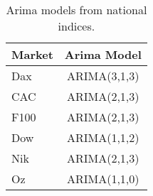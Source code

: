 \begin{table}[ht]
\centering
\caption[Arima models.]{Arima models  from national indices.} 
\label{tab:chp_ts_arima_models}
\begin{tabular}{lc}
  \toprule Market & Arima Model \\ 
  \midrule Dax & ARIMA(3,1,3)                    \\ 
  CAC & ARIMA(2,1,3)                    \\ 
  F100 & ARIMA(2,1,3)                    \\ 
  Dow & ARIMA(1,1,2)                    \\ 
  Nik & ARIMA(2,1,3)                    \\ 
  Oz & ARIMA(1,1,0)                    \\ 
   \bottomrule \end{tabular}
\end{table}
